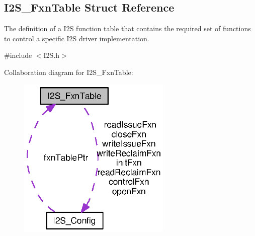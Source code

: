\subsection{I2\+S\+\_\+\+Fxn\+Table Struct Reference}
\label{struct_i2_s___fxn_table}


The definition of a I2\+S function table that contains the required set of functions to control a specific I2\+S driver implementation.  




{\ttfamily \#include $<$I2\+S.\+h$>$}



Collaboration diagram for I2\+S\+\_\+\+Fxn\+Table\+:
\nopagebreak
\begin{figure}[H]
\begin{center}
\leavevmode
\includegraphics[width=207pt]{struct_i2_s___fxn_table__coll__graph}
\end{center}
\end{figure}
